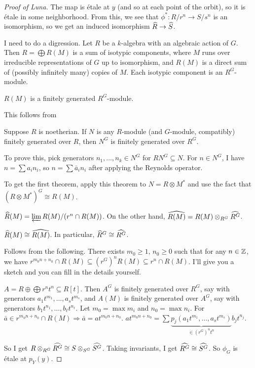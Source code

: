 \begin{proof}[Proof of Luna]
 The map is \'etale at $y$ (and so at each point of the orbit), so it is \'etale in some neighborhood. From this, we see that $\phi^*\colon R/ r^n\to S/s^n$ is an isomorphism, so we get an induced isomorphism $\widehat{R}\to \widehat{S}$.
 
 I need to do a digression. Let $R$ be a $k$-algebra with an algebraic action of $G$. Then $R=\bigoplus R(M)$ is a sum of isotypic components, where $M$ runs over irreducible representations of $G$ up to isomorphism, and $R(M)$ is a direct sum of (possibly infinitely many) copies of $M$. Each isotypic component is an $R^G$-module. 
 \begin{theorem}
  $R(M)$ is a finitely generated $R^G$-module.
 \end{theorem}
 This follows from
 \begin{theorem}
  Suppose $R$ is noetherian. If $N$ is any $R$-module (and $G$-module, compatibly) finitely generated over $R$, then $N^G$ is finitely generated over $R^G$.
 \end{theorem}
 To prove this, pick generators $n_1,\dots, n_k\in N^G$ for $RN^G\subseteq N$. For $n\in N^G$, I have $n=\sum a_i n_i$, so $n=\sum \bar a_i n_i$ after applying the Reynolds operator.
 
 To get the first theorem, apply this theorem to $N=R\otimes M^*$ and use the fact that $(R\otimes M^*)^G\cong R(M)$.
 
 $\widehat{R}(M) = \varprojlim R(M)/(r^n\cap R(M))$. On the other hand, $\widehat{R(M)} = R(M)\otimes_{R^G} \widehat{R^G}$.
 \begin{lemma}
  $\widehat{R}(M)\cong \widehat{R(M)}$. In particular, $\widehat{R}^G\cong \widehat{R^G}$.
 \end{lemma}
 Follows from the following. There exists $m_0\ge 1$, $n_0\ge 0$ such that for any $n\in \mathbb{Z}$, we have $r^{m_0n+n_0}\cap R(M)\subseteq (r^G)^nR(M)\subseteq r^n \cap R(M)$. I'll give you a sketch and you can fill in the details yourself.
 
 $A= R\oplus \bigoplus r^n t^n \subseteq R[t]$. Then $A^G$ is finitely generated over $R^G$, say with generators $a_1t^{m_1},\dots, a_st^{m_s}$, and $A(M)$ is finitely generated over $A^G$, say with generators $b_1t^{n_1},\dots, b_\ell t^{n_\ell}$. Let $m_0=\max m_i$ and $n_0=\max n_i$. For $\bar a\in r^{m_0n+n_0}\cap R(M)\Rightarrow \bar a=a t^{m_0n+n_0}$. $at^{m_0n+n_0} = \sum \underbrace{p_j(a_1t^{m_1},\dots, a_s t^{m_s})}_{\in (r^G)^n t^n} b_j t^{n_j}$.
 
 So I get $R\otimes_{R^G}\widehat{R^G}\cong S\otimes_{S^G}\widehat{S^G}$. Taking invariants, I get $\widehat{R^G}\cong \widehat{S^G}$. So $\phi_G$ is \'etale at $p_Y(y)$.
 

\end{proof}
